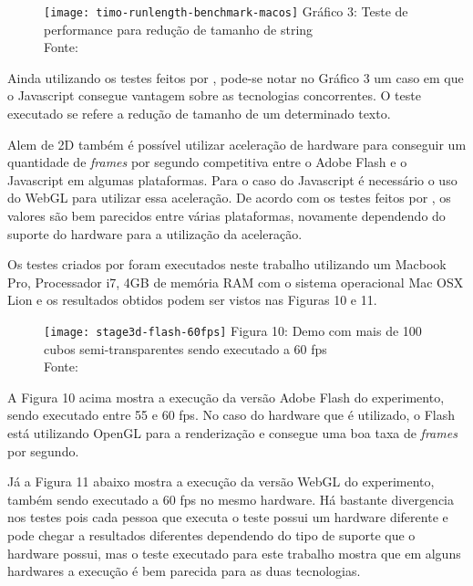 \begin{figure}[H]
  \centering
	\texttt{[image: timo-runlength-benchmark-macos]}
	\footnotesize\hspace{8\baselineskip}
	Gráfico 3: Teste de performance para redução de tamanho de string \\
	Fonte: \cite{performanceria}
  \label{img:timo-runlength-benchmark-macos}
\end{figure}

Ainda utilizando os testes feitos por ,
pode-se notar no Gráfico 3 um
caso em que o Javascript consegue vantagem sobre as tecnologias
concorrentes. O teste executado se refere a redução de tamanho de um
determinado texto.

Alem de 2D também é possível utilizar aceleração de hardware para conseguir um quantidade
de \textit{frames} por segundo competitiva entre o Adobe Flash e o
Javascript em algumas plataformas. Para o caso do Javascript é necessário o uso do WebGL para
utilizar essa aceleração. De acordo com os testes feitos por
, os valores são bem parecidos entre várias
plataformas, novamente dependendo do suporte do hardware para a
utilização da aceleração.

Os testes criados por  foram executados
neste trabalho utilizando um Macbook Pro, Processador i7, 4GB de memória RAM com o sistema operacional
Mac OSX Lion e os resultados obtidos podem ser vistos nas Figuras 10
e 11.

\begin{figure}[H]
  \centering
	\texttt{[image: stage3d-flash-60fps]}
	\footnotesize\hspace{8\baselineskip}
	Figura 10: Demo com mais de 100 cubos semi-transparentes sendo
	executado a 60 fps \\
	Fonte: \cite{website:stage3dperformance}
  \label{img:stage3d-flash-60fps}
\end{figure}

A Figura 10 acima mostra a execução da
versão Adobe Flash do experimento, sendo executado entre 55 e 60 fps.
No caso do hardware que é utilizado, o Flash está utilizando OpenGL
para a renderização e consegue uma boa taxa de \textit{frames} por
segundo.

Já a Figura 11 abaixo mostra a execução da
versão WebGL do experimento, também sendo executado a 60 fps no mesmo
hardware. Há bastante divergencia nos testes pois cada pessoa que
executa o teste possui um hardware diferente e pode chegar a
resultados diferentes dependendo do tipo de suporte que o hardware
possui, mas o teste executado para este trabalho mostra que em alguns
hardwares a execução é bem parecida para as duas tecnologias.


